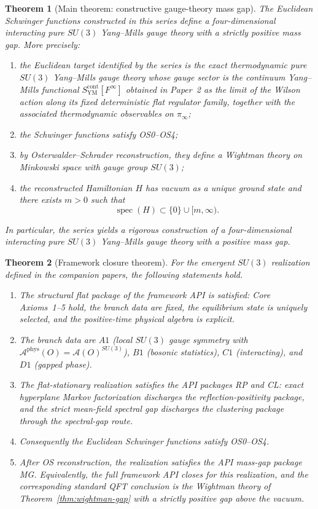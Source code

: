 \documentclass[11pt]{article}
\newtheorem{theorem}{Theorem}[section]
\theoremstyle{definition}
\theoremstyle{remark}
\newcommand{\mcA}{\mathcal A}
\newcommand{\spec}{\operatorname{spec}}
\begin{document}
\begin{theorem}[Main theorem: constructive gauge-theory mass gap]
\label{thm:main}
The Euclidean Schwinger functions constructed in this series define a
four-dimensional interacting pure $SU(3)$ Yang--Mills gauge theory with a strictly
positive mass gap.
More precisely:
\begin{enumerate}[label=\textnormal{(\roman*)},leftmargin=1.5em]
\item the Euclidean target identified by the series is the exact thermodynamic
pure $SU(3)$ Yang--Mills gauge theory whose gauge sector is the continuum
Yang--Mills functional $S_{\mathrm{YM}}^{\mathrm{cont}}[F^\infty]$ obtained in
Paper~2 as the limit of the Wilson action along its fixed deterministic flat
regulator family, together with the associated thermodynamic observables on
$\pi_\infty$;
\item the Schwinger functions satisfy OS0--OS4;
\item by Osterwalder--Schrader reconstruction, they define a Wightman theory on
Minkowski space with gauge group $SU(3)$;
\item the reconstructed Hamiltonian $H$ has vacuum as a unique ground state and
there exists $m>0$ such that
\[
\spec(H)\subset\{0\}\cup[m,\infty).
\]
\end{enumerate}
In particular, the series yields a rigorous construction of a
four-dimensional interacting pure $SU(3)$ Yang--Mills gauge theory with a
positive mass gap.
\end{theorem}

\begin{theorem}[Framework closure theorem]
\label{thm:framework-closure}
For the emergent $SU(3)$ realization defined in the companion papers, the
following statements hold.
\begin{enumerate}[label=\textnormal{(\roman*)},leftmargin=1.5em]
\item The structural flat package of the framework API is satisfied: Core
Axioms~1--5 hold, the branch data are fixed, the equilibrium state is uniquely
selected, and the positive-time physical algebra is explicit.
\item The branch data are $A1$ (local $SU(3)$ gauge symmetry with
$\mcA^{\mathrm{phys}}(O)=\mcA(O)^{SU(3)}$), $B1$ (bosonic statistics),
$C1$ (interacting), and $D1$ (gapped phase).
\item The flat-stationary realization satisfies the API packages RP and CL:
exact hyperplane Markov factorization discharges the reflection-positivity
package, and the strict mean-field spectral gap discharges the clustering
package through the spectral-gap route.
\item Consequently the Euclidean Schwinger functions satisfy OS0--OS4.
\item After OS reconstruction, the realization satisfies the API mass-gap
package MG.  Equivalently, the full framework API closes for this realization,
and the corresponding standard QFT conclusion is the Wightman theory of
Theorem~\ref{thm:wightman-gap} with a strictly positive gap above the vacuum.
\end{enumerate}
\end{theorem}
\end{document}

